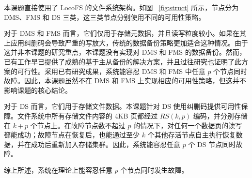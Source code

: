 本课题直接使用了 LocoFS 的文件系统架构。如图 ~\ref{fig:struct} 所示，节点分为 DMS、FMS 和 DS 三类，这三类节点分别使用不同的可用性策略。

对于 DMS 和 FMS 而言，它们仅用于存储元数据，并且读写粒度较小。如果在其上应用纠删码会导致严重的写放大，传统的数据备份策略更加适合这种情况。由于这并非本课题的研究重点，本课题没有实现对 DMS 和 FMS 的数据备份。然而，已有工作\cite{mojim2015}早已提供了成熟的基于主从备份的解决方案，并且过往研究也证明了此方案的可行性\cite{orion2019}。采用已有研究成果，系统能容忍 DMS 和 FMS 中任意 $p$ 个节点同时故障。因此，本课题虽然不在 DMS 和 FMS 上实现相应的可用性策略，但这并不影响课题的核心结论。

对于 DS 而言，它们用于存储文件数据。本课题针对 DS 使用纠删码提供可用性保障。文件系统中所有存储文件内容的 4KB 页都经过 $RS(k, p)$ 编码，并分别存储在 $k + p$ 个节点上。在故障节点数不超过 $p$ 的情况下，对任何一个数据页的读写都能成功；故障节点在恢复后，也能通过至少 $k$ 个其他存活节点自主执行恢复数据，并在成功后重新加入存储集群。因此，系统能容忍任意 $p$ 个 DS 节点同时故障。

综上所述，系统在理论上能容忍任意 $p$ 个节点同时发生故障。

